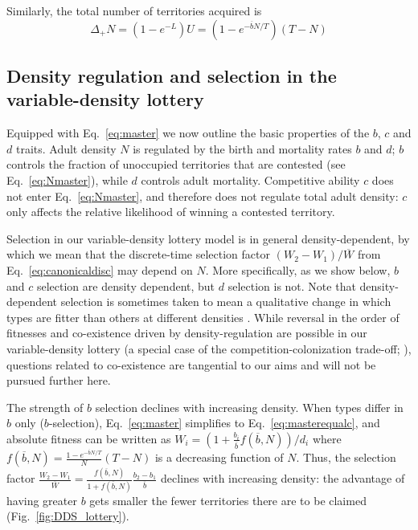 \documentclass[12pt]{article}
\begin{document}
Similarly, the total number of territories acquired is
\begin{equation}
\Delta_+ N=(1-e^{-L})U=(1-e^{-\overline{b}N/T})(T-N) \label{eq:Nmaster}
\end{equation} 

\subsection*{Density regulation and selection in the variable-density lottery}

Equipped with Eq.~\eqref{eq:master} we now outline the basic properties of the $b$, $c$ and $d$ traits. Adult density $N$ is regulated by the birth and mortality rates $b$ and $d$; $b$ controls the fraction of unoccupied territories that are contested (see Eq.~\eqref{eq:Nmaster}), while $d$ controls adult mortality. Competitive ability $c$ does not enter Eq.~\eqref{eq:Nmaster}, and therefore does not regulate total adult density: $c$ only affects the relative likelihood of winning a contested territory.

Selection in our variable-density lottery model is in general density-dependent, by which we mean that the discrete-time selection factor $(W_2-W_1)/\overline{W}$ from Eq.~\eqref{eq:canonicaldisc} may depend on $N$. More specifically, as we show below, $b$ and $c$ selection are density dependent, but $d$ selection is not. Note that density-dependent selection is sometimes taken to mean a qualitative change in which types are fitter than others at different densities \citep{travis_2013}. While reversal in the order of fitnesses and co-existence driven by density-regulation are possible in our variable-density lottery (a special case of the competition-colonization trade-off; \citealt{levins_71,tilman_94,bolker_99}), questions related to co-existence are tangential to our aims and will not be pursued further here.

The strength of $b$ selection declines with increasing density. When types differ in $b$ only ($b$-selection), Eq.~\eqref{eq:master} simplifies to Eq.~\eqref{eq:masterequalc}, and absolute fitness can be written as $W_i=(1+\frac{b_i}{\overline{b}}f(\overline{b},N))/d_i$ where $f(\overline{b},N)=\frac{1-e^{-\overline{b}N/T}}{N}(T-N)$ is a decreasing function of $N$. Thus, the selection factor $\frac{W_2-W_1}{\overline{W}}=\frac{f(\overline{b},N)}{1+f(\overline{b},N)}\frac{b_2-b_1}{\overline{b}}$ declines with increasing density: the advantage of having greater $b$ gets smaller the fewer territories there are to be claimed (Fig.~\ref{fig:DDS_lottery}). 
\end{document}
